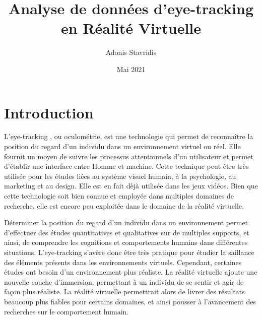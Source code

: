 \documentclass[hidelinks,12pt]{article}
\title{\textbf{Analyse de données d’eye-tracking en Réalité Virtuelle}}
\author{\Large{Adonis Stavridis}}
\date{Mai 2021}
\begin{document}

\maketitle
\tableofcontents
\pagebreak


\section{Introduction}

L'eye-tracking \cite{wiki_eye_tracking}, ou oculométrie, est une technologie
qui permet de reconnaître la position du regard d'un individu dans un
environnement virtuel ou réel. Elle fournit un moyen de suivre les processus
attentionnels d'un utilisateur et permet d'établir une interface entre
Homme et machine. Cette technique peut être très utilisée pour les études liées
au système visuel humain, à la psychologie, au marketing et au design. Elle est
en fait dèjà utilisée dans les jeux vidéos. Bien que cette technologie soit
bien connue et employée dans multiples domaines de recherche, elle est encore
peu exploitée dans le domaine de la réalité virtuelle.

\bigskip
Déterminer la position du regard d'un individu dans un environnement permet
d'effectuer des études quantitatives et qualitatives sur de multiples supports,
et ainsi, de comprendre les cognitions et comportements humains dans différentes
situations. L'eye-tracking s'avère donc être très pratique pour étudier la
saillance des éléments présents dans les environnements virtuels. Cependant,
certaines études ont besoin d'un environnement plus réaliste. La réalité
virtuelle ajoute une nouvelle couche d'immersion, permettant à un individu de
se sentir et agir de façon plus réaliste. La réalité virtuelle permettrait
alors de livrer des résultats beaucoup plus fiables pour certains domaines, et
ainsi pousser à l'avancement des recherches sur le comportement humain.
\end{document}
